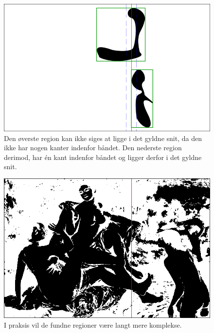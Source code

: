 {\begin{figure}[h]
    \begin{center}
        \includegraphics[scale=\imgscale,angle=0]{afsnit/vores_implementation/billeder/naiv_algoritme/bbox_section}
    \end{center}
    \caption[Afgrænsende rektangler]{Den øverste region kan ikke
    siges at ligge i det gyldne snit, da den ikke har nogen kanter
    indenfor båndet. Den nederste region derimod, har én kant
    indenfor båndet og ligger derfor i det gyldne snit.}
    \label{bbox_section}
\end{figure}

\begin{figure}[!h]
    \begin{center}
        \includegraphics[scale=0.42,angle=0]{afsnit/vores_implementation/billeder/naiv_algoritme/bathers_mockup_blob}
    \end{center}
    \caption[Interessante regioner i praksis]{I praksis vil de
    fundne regioner være langt mere komplekse.}
    \label{realworld_example}
\end{figure}

}
